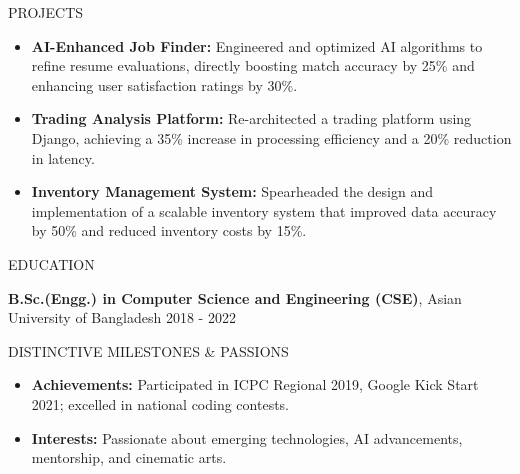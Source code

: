 \documentclass{resume} %
\begin{document}
\begin{rSection}{PROJECTS}

\begin{itemize}
    \item \textbf{AI-Enhanced Job Finder:} Engineered and optimized AI algorithms to refine resume evaluations, directly boosting match accuracy by 25\% and enhancing user satisfaction ratings by 30\%.
    \item \textbf{Trading Analysis Platform:} Re-architected a trading platform using Django, achieving a 35\% increase in processing efficiency and a 20\% reduction in latency.
    \item \textbf{Inventory Management System:} Spearheaded the design and implementation of a scalable inventory system that improved data accuracy by 50\% and reduced inventory costs by 15\%.
\end{itemize}

\end{rSection} 


\begin{rSection}{EDUCATION}

{\bf B.Sc.(Engg.) in Computer Science and Engineering (CSE)}, Asian University of Bangladesh \hfill {2018 - 2022}

\end{rSection}


\begin{rSection}{DISTINCTIVE MILESTONES \& PASSIONS} 

\begin{itemize} 
    \item \textbf{Achievements:} Participated in ICPC Regional 2019, Google Kick Start 2021; excelled in national coding contests.
    \item \textbf{Interests:} Passionate about emerging technologies, AI advancements, mentorship, and cinematic arts.
\end{itemize}

\end{rSection}
\end{document}
